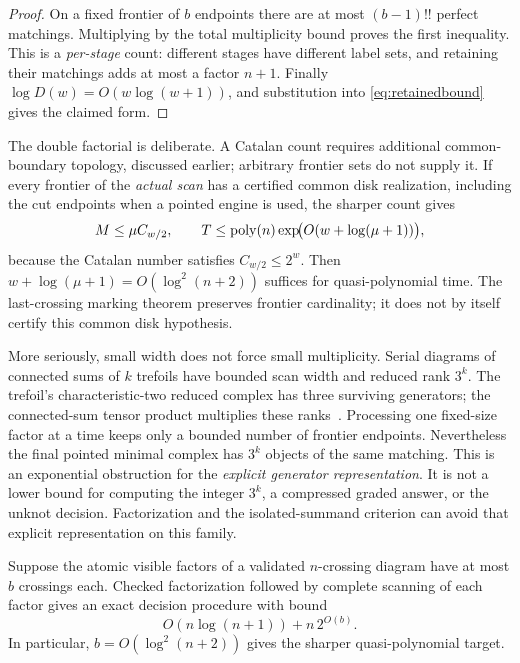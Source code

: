 \begin{proof}
On a fixed frontier of $b$ endpoints there are at most $(b-1)!!$ perfect
matchings.  Multiplying by the total multiplicity bound proves the first
inequality.  This is a \emph{per-stage} count: different stages have different
label sets, and retaining their matchings adds at most a factor $n+1$.
Finally $\log D(w)=O(w\log(w+1))$, and substitution into
\eqref{eq:retainedbound} gives the claimed form.
\end{proof}

The double factorial is deliberate.  A Catalan count requires additional
common-boundary topology, discussed earlier; arbitrary frontier sets do not
supply it.  If every frontier of the \emph{actual scan} has a certified common
disk realization, including the cut endpoints when a pointed engine is used,
the sharper count gives
\[
 M\leq\mu C_{w/2},\qquad
 T\leq\operatorname{poly}(n)\exp\!\bigl(O(w+\log(\mu+1))\bigr),
\]
because the Catalan number satisfies $C_{w/2}\leq2^w$.
Then $w+\log(\mu+1)=O(\log^2(n+2))$ suffices for quasi-polynomial time.
The last-crossing marking theorem preserves frontier cardinality; it does
not by itself certify this common disk hypothesis.

More seriously, small width does not force small multiplicity.
Serial diagrams of connected sums of $k$ trefoils have bounded scan width
and reduced rank $3^k$.  The trefoil's characteristic-two reduced complex
has three surviving generators; the connected-sum tensor product multiplies
these ranks~\cite[Sections~3--4]{khovanov2002}.  Processing one fixed-size factor at a time keeps
only a bounded number of frontier endpoints.  Nevertheless the final
pointed minimal complex has $3^k$ objects of the same matching.  This is an
exponential obstruction for the \emph{explicit generator representation}.
It is not a lower bound for computing the integer $3^k$, a compressed graded
answer, or the unknot decision.  Factorization and the isolated-summand
criterion can avoid that explicit representation on this family.

\begin{corollary}
\label{cor:small-factors}
Suppose the atomic visible factors of a validated $n$-crossing diagram have
at most $b$ crossings each.  Checked factorization followed by complete
scanning of each factor gives an exact decision procedure with bound
\[
 O(n\log(n+1))+n\,2^{O(b)}.
\]
In particular, $b=O(\log^2(n+2))$ gives the sharper quasi-polynomial target.
\end{corollary}

